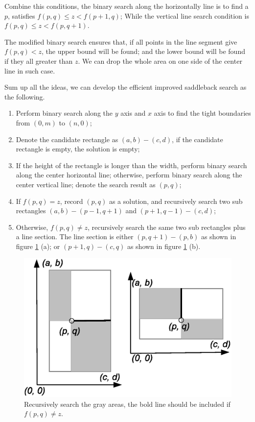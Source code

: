 \documentclass[UTF8]{article}
\begin{document}
Combine this conditions, the binary search along the horizontally line is to find a $p$, satisfies
$f(p, q) \leq z < f(p+1, q)$; While the vertical line search condition is $f(p, q) \leq z < f(p, q + 1)$.

The modified binary search ensures that, if all points in the line segment give $f(p, q) < z$, the upper
bound will be found; and the lower bound will be found if they all greater than $z$. We can drop the
whole area on one side of the center line in such case.

Sum up all the ideas, we can develop the efficient improved saddleback search as the following.

\begin{enumerate}
\item Perform binary search along the $y$ axis and $x$ axis to find the tight boundaries from $(0, m)$ to $(n, 0)$;
\item Denote the candidate rectangle as $(a, b) - (c, d)$, if the candidate rectangle is empty, the solution is empty;
\item If the height of the rectangle is longer than the width, perform binary search along the center horizontal line; otherwise, perform binary search along the center vertical line; denote the search result as $(p, q)$;
\item If $f(p, q) = z$, record $(p, q)$ as a solution, and recursively search two sub rectangles $(a, b) - (p-1, q+1)$ and
$(p+1, q-1) - (c, d)$;
\item Otherwise, $f(p, q) \neq z$, recursively search the same two sub rectangles plus a line section. The line section
is either $(p, q+1) - (p, b)$ as shown in figure \ref{fig:include-line} (a); or $(p+1, q) - (c, q)$ as shown in
figure \ref{fig:include-line} (b).
\end{enumerate}

\begin{figure}[htbp]
 \centering
 \includegraphics[scale=0.5]{img/saddleback-include-ln.eps}
 \caption{Recursively search the gray areas, the bold line should be included if $f(p, q) \neq z$.}
 \label{fig:include-line}
\end{figure}
\end{document}
